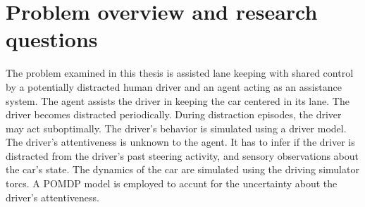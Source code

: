 



\section{Problem overview and research questions}

The problem examined in this thesis is assisted lane keeping with shared control by a potentially distracted human driver and an agent acting as an assistance system. The agent assists the driver in keeping the car centered in its lane. The driver becomes distracted periodically. During distraction episodes, the driver may act suboptimally. The driver's behavior is simulated using a driver model. The driver’s attentiveness is unknown to the agent. It has to infer if the driver is distracted from the driver's past steering activity, and sensory observations about the car's state. The dynamics of the car are simulated using the driving simulator \Gls{torcs}. A POMDP model is employed to accunt for the uncertainty about the driver's attentiveness.

